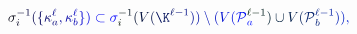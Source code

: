 \documentclass[12pt]{article}
\begin{document}
\makeatletter
\renewcommand*{\@textcolor}[3]{%
  \protect\leavevmode
  \begingroup
    \color#1{#2}#3%
  \endgroup
}
\makeatother
\begin{displaymath}
\mathcolor[RGB]{0,0,15}{\sigma} _ { \mathcolor[RGB]{0,0,30}{i} } ^ { \mathcolor[RGB]{0,0,45}{-} \mathcolor[RGB]{0,0,60}{1} } \mathcolor[RGB]{0,0,75}{(} \mathcolor[RGB]{0,0,90}{\{} \mathcolor[RGB]{0,0,105}{\kappa} _ { \mathcolor[RGB]{0,0,120}{a} } ^ { \mathcolor[RGB]{0,0,135}{\ell} } \mathcolor[RGB]{0,0,150}{,} \mathcolor[RGB]{0,0,165}{\kappa} _ { \mathcolor[RGB]{0,0,180}{b} } ^ { \mathcolor[RGB]{0,0,195}{\ell} } \mathcolor[RGB]{0,0,210}{\}} \mathcolor[RGB]{0,0,225}{)} \mathcolor[RGB]{0,0,240}{\subset} \mathcolor[RGB]{0,0,255}{\sigma} _ { \mathcolor[RGB]{0,15,0}{i} } ^ { \mathcolor[RGB]{0,15,15}{-} \mathcolor[RGB]{0,15,30}{1} } \mathcolor[RGB]{0,15,45}{(} \mathcolor[RGB]{0,15,60}{V} \mathcolor[RGB]{0,15,75}{(} \mathcolor[RGB]{0,15,90}{\K} ^ { \mathcolor[RGB]{0,15,105}{\ell} \mathcolor[RGB]{0,15,120}{-} \mathcolor[RGB]{0,15,135}{1} } \mathcolor[RGB]{0,15,150}{)} \mathcolor[RGB]{0,15,165}{)} \mathcolor[RGB]{0,15,180}{\setminus} \mathcolor[RGB]{0,15,195}{(} \mathcolor[RGB]{0,15,210}{V} \mathcolor[RGB]{0,15,225}{(} \mathcal { \mathcolor[RGB]{0,15,240}{P} } _ { \mathcolor[RGB]{0,15,255}{a} } ^ { \mathcolor[RGB]{0,30,0}{\ell} \mathcolor[RGB]{0,30,15}{-} \mathcolor[RGB]{0,30,30}{1} } \mathcolor[RGB]{0,30,45}{)} \mathcolor[RGB]{0,30,60}{\cup} \mathcolor[RGB]{0,30,75}{V} \mathcolor[RGB]{0,30,90}{(} \mathcal { \mathcolor[RGB]{0,30,105}{P} } _ { \mathcolor[RGB]{0,30,120}{b} } ^ { \mathcolor[RGB]{0,30,135}{\ell} \mathcolor[RGB]{0,30,150}{-} \mathcolor[RGB]{0,30,165}{1} } \mathcolor[RGB]{0,30,180}{)} \mathcolor[RGB]{0,30,195}{)} \mathcolor[RGB]{0,30,210}{,}
\end{displaymath}
\end{document}
